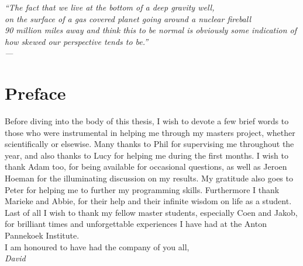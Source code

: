 
\begin{flushright}{\slshape 
``The fact that we live at the bottom of a deep gravity well,\\ on the surface of a gas covered planet going around a nuclear fireball \\ 90 million miles away and think this to be normal is obviously some indication of how skewed our perspective tends to be.''
	 \\ \medskip
	--- }
\end{flushright}

\clearpage

\begingroup
\let\clearpage\relax
\let\cleardoublepage\relax
\let\cleardoublepage\relax
\chapter*{Preface}
Before diving into the body of this thesis, I wish to devote a few brief words to those who were instrumental in helping me through my masters project, whether scientifically or elsewise. Many thanks to Phil for supervising me throughout the year, and also thanks to Lucy for helping me during the first months. I wish to thank Adam too, for being available for occasional questions, as well as Jeroen Hoeman for the illuminating discussion on my results. My gratitude also goes to Peter for helping me to further my programming skills. Furthermore I thank Marieke and Abbie, for their help and their infinite wisdom on life as a student. Last of all I wish to thank my fellow master students, especially Coen and Jakob, for brilliant times and unforgettable experiences I have had at the Anton Pannekoek Institute.\\

I am honoured to have had the company of you all,\\
\hspace*{\linewidth}\hspace*{-1.8cm} \emph{David}\\


\endgroup